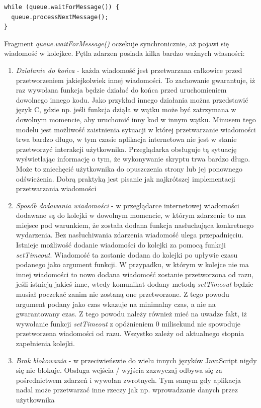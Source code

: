 \documentclass[polish, twoside, 12pt]{mwart}
\begin{document}
\begin{lstlisting}
while (queue.waitForMessage()) {
  queue.processNextMessage();
}
\end{lstlisting}

Fragment \emph{queue.waitForMessage()} oczekuje synchronicznie, aż pojawi się wiadomość w kolejkce. Pętla zdarzen posiada kilka bardzo ważnych własności:

\begin{enumerate}
  \item \emph{Działanie do końca} - każda wiadomość jest przetwarzana całkowice przed przetworzeniem jakiejkolwiek innej wiadomości. To zachowanie gwarantuje, iż raz wywołana funkcja będzie działać do końca przed uruchomieniem dowolnego innego kodu. Jako przykład innego działania można przedstawić język C, gdzie np. jeśli funkcja dziąła w wątku może być zatrzymana w dowolnym momencie, aby uruchomić inny kod w innym wątku. Minusem tego modelu jest możliwość zaistnienia sytuacji w której przetwarzanie wiadomości trwa bardzo długo, w tym czasie aplikacja internetowa nie jest w stanie przetworzyć interakcji użytkownika. Przeglądarka obsługuje tą sytuację wyświetlając informację o tym, że wykonywanie skryptu trwa bardzo długo. Może to zniechęcić użytkownika do opuszczenia strony lub jej ponownego odświeżenia. Dobrą praktyką jest pisanie jak najkrótszej implementacji przetwarzania wiadomości
  \item \emph{Sposób dodawania wiadomości} - w przeglądarce internetowej wiadomości dodawane są do kolejki w dowolnym momencie, w którym zdarzenie to ma miejsce pod warunkiem, że została dodana funkcja nasłuchująca konkretnego wydarzenia. Bez nasłuchiwania zdarzenia wiadomość ulega przepadnięciu. Istnieje możliwość dodanie wiadomości do kolejki za pomocą funkcji \emph{setTimeout}. Wiadomość ta zostanie dodana do kolejki po upływie czasu podanego jako argument funkcji. W przypadku, w którym w kolejce nie ma innej wiadomości to nowo dodana wiadomość zostanie przetworzona od razu, jeśli istnieją jakieś inne, wtedy komunikat dodany metodą \emph{setTimeout} będzie musiał poczekać zanim nie zostaną one przetworzone. Z tego powodu argument podany jako czas wkazuje na minimalny czas, a nie na gwarantowany czas. Z tego powodu należy również mieć na uwadze fakt, iż wywołanie funkcji \emph{setTimeout} z opóżnieniem 0 milisekund nie spowoduje przetworzena wiadomości od razu. Wszystko zależy od aktualnego stopnia zapełnienia kolejki.
  \item \emph{Brak blokowania} - w przeciwieńswie do wielu innych języków JavaScript nigdy się nie blokuje. Obsługa wejścia / wyjścia zazwyczaj odbywa się za pośrednictwem zdarzeń i wywołan zwrotnych. Tym samym gdy aplikacja nadal może przetwarzać inne rzeczy jak np. wprowadzanie danych przez użytkownika
\end{enumerate}
\end{document}
